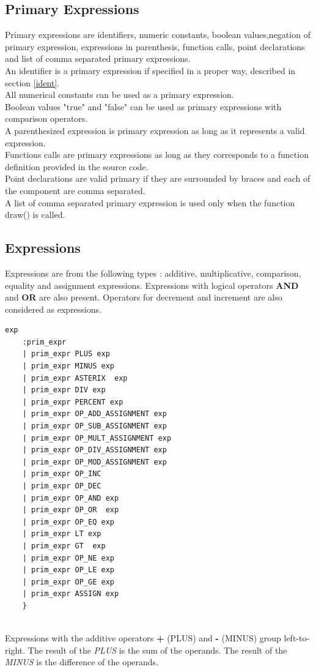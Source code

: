\documentclass{l3proj}
\begin{document}
\subsection{Primary Expressions}
Primary expressions are identifiers, numeric constants, boolean values,negation of primary expression, expressions in parenthesis, function calls, point declarations  and list of comma separated primary expressions.\\
An identifier is a primary expression if specified in a proper way, described in section \ref{ident}.\\ All numerical constants can be used as a primary expression.\\ Boolean values "true" and "false" can be used as primary expressions with comparison operators.\\ A parenthesized expression is primary expression as long as it represents a valid expression.\\ Functions calls are primary expressions as long as they corresponds to a function definition provided in the source code. \\Point declarations are valid primary  if they are surrounded by braces and each of the component are comma separated.\\ A list of comma separated primary expression is used only when the function draw() is called.  

\subsection{Expressions}
\label{expr-man}
Expressions are from the following types : additive, multiplicative, comparison, equality and assignment expressions. Expressions with logical operators \textbf{AND} and \textbf{OR} are also present. Operators for decrement and increment are also considered as expressions. 
\begin{lstlisting}
exp
    :prim_expr
    | prim_expr PLUS exp 
    | prim_expr MINUS exp
    | prim_expr ASTERIX  exp
    | prim_expr DIV exp  
    | prim_expr PERCENT exp 
    | prim_expr OP_ADD_ASSIGNMENT exp 
    | prim_expr OP_SUB_ASSIGNMENT exp 
    | prim_expr OP_MULT_ASSIGNMENT exp
    | prim_expr OP_DIV_ASSIGNMENT exp 
    | prim_expr OP_MOD_ASSIGNMENT exp 
    | prim_expr OP_INC  
    | prim_expr OP_DEC  
    | prim_expr OP_AND exp 
    | prim_expr OP_OR  exp 
    | prim_expr OP_EQ exp 
    | prim_expr LT exp 
    | prim_expr GT  exp
    | prim_expr OP_NE exp
    | prim_expr OP_LE exp
    | prim_expr OP_GE exp
    | prim_expr ASSIGN exp     
    }
      
\end{lstlisting}
Expressions with the additive operators \textbf{+} (PLUS) and \textbf{-} (MINUS) group left-to-right. The result of the \textit{PLUS} is the sum of the operands. The result of the \textit{MINUS} is the difference of the operands.
\end{document}
